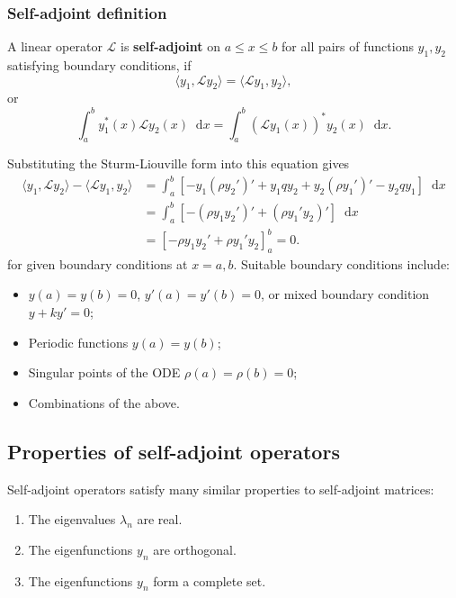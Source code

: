 \documentclass[12pt]{article}
\newcommand{\diff}{\mathop{}\!\mathrm{d}}
\theoremstyle{definition}
\theoremstyle{remark}
\begin{document}
\subsubsection{Self-adjoint definition}%
\label{subsub:self_adjoint_definition}

A linear operator $\mathcal{L}$ is \textbf{self-adjoint} on $a \leq x \leq b$ for all pairs of functions $y_1, y_2$ satisfying boundary conditions, if
\[
	\langle y_1, \mathcal{L}y_2 \rangle = \langle \mathcal{L}y_1, y_2 \rangle
,\]
or
\[
	\int_{a}^{b} y^{\ast}_1(x) \mathcal{L}y_2(x)\diff x = \int_{a}^{b} (\mathcal{L}y_1(x))^{\ast} y_2(x) \diff x
.\]

Substituting the Sturm-Liouville form into this equation gives
\begin{align*}
	\langle y_1, \mathcal{L}y_2 \rangle - \langle \mathcal{L}y_1, y_2 \rangle &= \int_{a}^{b} [-y_1(\rho y_2')' + y_1qy_2 + y_2(\rho y_1')' - y_2 qy_1]\diff x \\
										  &= \int_{a}^{b} [-(\rho y_1 y_2')' + (\rho y_1' y_2)']\diff x \\
										  &= \left[ - \rho y_1 y_2' + \rho y_1' y_2 \right]_{a}^{b} = 0.
\end{align*}
for given boundary conditions at $x = a, b$. Suitable boundary conditions include:
\begin{itemize}
	\item $y(a) = y(b) = 0$, $y'(a) = y'(b) = 0$, or mixed boundary condition $y + ky' = 0$;
	\item Periodic functions $y(a) = y(b)$;
	\item Singular points of the ODE $\rho(a) = \rho(b) = 0$;
	\item Combinations of the above.
\end{itemize}

\subsection{Properties of self-adjoint operators}%
\label{sub:properties_of_self_adjoint_operators}

Self-adjoint operators satisfy many similar properties to self-adjoint matrices:
\begin{enumerate}[1.]
	\item The eigenvalues $\lambda_n$ are real.
	\item The eigenfunctions $y_n$ are orthogonal.
	\item The eigenfunctions $y_n$ form a complete set.
\end{enumerate}
\end{document}
